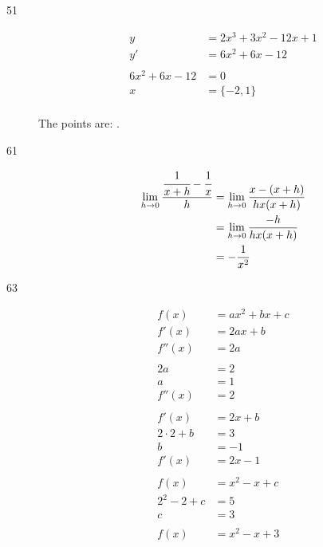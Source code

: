 \documentclass[letterpaper, landscape]{exam}
\begin{document}
\begin{description}
\begin{enumerate}[(a)]
      \end{enumerate}

    \item[51]
      \begin{align*}
        y              & = 2x^3 + 3x^2 - 12x + 1 \\
        y'             & = 6x^2 + 6x - 12 \\
        \\
        6x^2 + 6x - 12 & = 0 \\
        x              & = \{ -2, 1 \} \\
      \end{align*}

      The points are: .

    \item[61]
      \begin{align*}
        \lim_{h \to 0} \frac{\cfrac{1}{x + h} - \cfrac{1}{x}}{h} & = \lim_{h \to 0} \frac{x - (x + h)}{hx(x + h)} \\
                                                                 & = \lim_{h \to 0} \frac{-h}{hx(x + h)} \\
                                                                 & = - \frac{1}{x^2} \\
      \end{align*}

    \item[63]
      \begin{align*}
        f(x)          & = ax^2 + bx + c \\
        f'(x)         & = 2ax + b \\
        f''(x)        & = 2a \\
        \\
        2a            & = 2 \\
        a             & = 1 \\
        f''(x)        &= 2 \\
        \\
        f'(x)         & = 2x + b \\
        2 \cdot 2 + b & = 3 \\
        b             & = -1 \\
        f'(x)         & = 2x - 1 \\
        \\
        f(x)          & = x^2 - x + c \\
        2^2 - 2 + c   & = 5 \\
        c             & = 3 \\
        \\
        f(x)          & = \boxed{ x^2 - x + 3 } \\
      \end{align*}
   \end{description}
 
\end{document}
